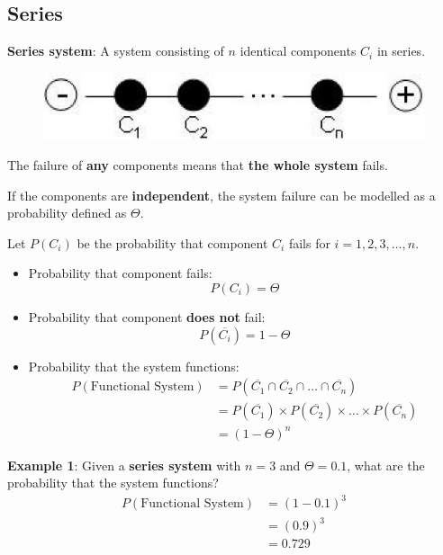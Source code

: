 \documentclass[10pt,a4paper]{article}
\begin{document}
\subsection{Series}

\begin{tcolorbox}[breakable,colback=white]
\textbf{Series system}: A system consisting of $n$ identical components $C_i$ in series.
\end{tcolorbox}
\begin{figure} [h!]
    \centering
    \includegraphics[scale=0.4]{serial_circuit.JPG}
\end{figure}
The failure of \textbf{any} components means that \textbf{the whole system} fails. 

If the components are \textbf{independent}, the system failure can be modelled as a probability
defined as $\Theta$.

Let $P(C_i)$ be the probability that component $C_i$ fails for $i=1,2,3,\dots,n$.
\begin{itemize}
    \item Probability that component fails: 
    $$
        P(C_i) = \Theta
    $$
    \item Probability that component \textbf{does not} fail: 
    $$
        P(\overline{C_i})=1-\Theta
    $$
    \item Probability that the system functions:
    \begin{align*}
        P(\text{Functional System}) &= P(\overline{C_1} \cap \overline{C_2} \cap \dots \cap \overline{C_n}) \\
        &= P(\overline{C_1}) \times P(\overline{C_2}) \times \dots \times P(\overline{C_n}) \\
        &= (1-\Theta)^n
    \end{align*}
\end{itemize}

\textbf{Example 1}: Given a \textbf{series system} with $n=3$ and $\Theta=0.1$, what are the
probability that the system functions?
\begin{align*}
    P(\text{Functional System}) &= (1-0.1)^3 \\
    &= (0.9)^3 \\
    &= 0.729
\end{align*}
\end{document}

